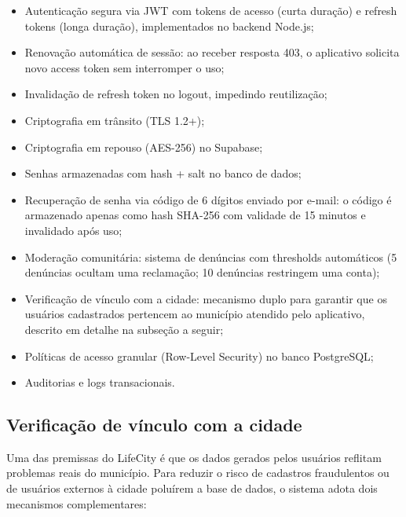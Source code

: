 \begin{itemize}
  \item Autenticação segura via JWT com tokens de acesso (curta duração) e
        refresh tokens (longa duração), implementados no backend Node.js;
  \item Renovação automática de sessão: ao receber resposta 403, o aplicativo
        solicita novo access token sem interromper o uso;
  \item Invalidação de refresh token no logout, impedindo reutilização;
  \item Criptografia em trânsito (TLS 1.2+);
  \item Criptografia em repouso (AES-256) no Supabase;
  \item Senhas armazenadas com hash + salt no banco de dados;
  \item Recuperação de senha via código de 6 dígitos enviado por e-mail: o código é armazenado apenas como hash SHA-256 com validade de 15 minutos e invalidado após uso;
  \item Moderação comunitária: sistema de denúncias com thresholds automáticos (5 denúncias ocultam uma reclamação; 10 denúncias restringem uma conta);
  \item Verificação de vínculo com a cidade: mecanismo duplo para garantir que os usuários cadastrados pertencem ao município atendido pelo aplicativo, descrito em detalhe na subseção a seguir;
  \item Políticas de acesso granular (Row-Level Security) no banco PostgreSQL;
  \item Auditorias e logs transacionais.
\end{itemize}

\subsection{Verificação de vínculo com a cidade}

Uma das premissas do LifeCity é que os dados gerados pelos usuários reflitam
problemas reais do município. Para reduzir o risco de cadastros fraudulentos ou
de usuários externos à cidade poluírem a base de dados, o sistema adota dois
mecanismos complementares:

